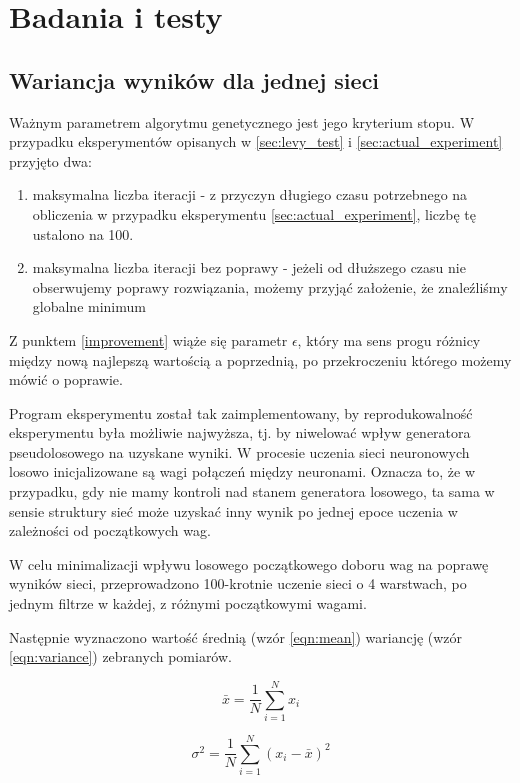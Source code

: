 \chapter{Badania i testy}\label{chap:tests}
\section{Wariancja wyników dla jednej sieci}\label{sec:std_dev}
Ważnym parametrem algorytmu genetycznego jest jego kryterium stopu.
W przypadku eksperymentów opisanych w \ref{sec:levy_test} i \ref{sec:actual_experiment} przyjęto dwa:
\begin{enumerate}
  \item maksymalna liczba iteracji - z przyczyn długiego czasu potrzebnego na obliczenia w przypadku eksperymentu \ref{sec:actual_experiment}, liczbę tę ustalono na 100.
  \item maksymalna liczba iteracji bez poprawy - jeżeli od dłuższego czasu nie obserwujemy poprawy rozwiązania, możemy przyjąć założenie, że znaleźliśmy globalne minimum\label{improvement}
\end{enumerate}
Z punktem \ref{improvement} wiąże się parametr $\epsilon$, który ma sens progu różnicy między nową najlepszą wartością a poprzednią, po przekroczeniu którego możemy mówić o poprawie.

Program eksperymentu został tak zaimplementowany, by reprodukowalność eksperymentu była możliwie najwyższa, tj. by niwelować wpływ generatora pseudolosowego na uzyskane wyniki.
W procesie uczenia sieci neuronowych losowo inicjalizowane są wagi połączeń między neuronami.
Oznacza to, że w przypadku, gdy nie mamy kontroli nad stanem generatora losowego, ta sama w sensie struktury sieć może uzyskać inny wynik po jednej epoce uczenia w zależności od początkowych wag.

W celu minimalizacji wpływu losowego początkowego doboru wag na poprawę wyników sieci, przeprowadzono 100-krotnie uczenie sieci o 4 warstwach, po jednym filtrze w każdej, z różnymi początkowymi wagami.

Następnie wyznaczono wartość średnią (wzór \ref{eqn:mean}) wariancję (wzór \ref{eqn:variance}) zebranych pomiarów.

\begin{equation}\label{eqn:mean}
  \bar{x} = \frac{1}{N} \sum_{i=1}^{N} x_i
\end{equation}

\begin{equation}\label{eqn:variance}
  \sigma^2 = \frac{1}{N} \sum_{i=1}^{N}(x_i - \bar{x})^2
\end{equation}

